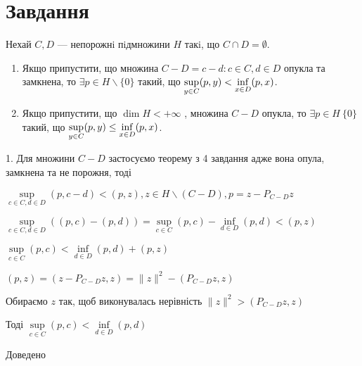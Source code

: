 
\chapter{Завдання \theHchapter}


\begin{tcolorbox}[title=Завдання]
    Нехай $C, D$ — непорожнi пiдмножини $H$ такi, що 
    $C \cap D = \emptyset$. 
    \begin{enumerate}
        \item 
            Якщо припустити, що множина 
            $C - D = {c - d : c \in C, d \in D}$ 
            опукла та замкнена,
            то $ \exists p \in H \backslash \{0\}$ такий, що 
            $ \displaystyle\sup_{y \in C} (p, y) < \displaystyle\inf_{x \in D} (p, x)$.
        \item
            Якщо припустити, що $\dim H < +\infty$ , множина $C - D$
            опукла, то $\exists p \in H\ \{0\}$
            такий, що 
            $\displaystyle\sup_{y \in C} (p, y) \le \displaystyle\inf_{x \in D}(p, x)$.
    \end{enumerate}
    
\end{tcolorbox}





1. Для множини $C - D$ застосуємо теорему з 4 завдання 
адже вона опула, замкнена та не порожня, тоді


$ \sup\limits_{c \in C, d \in D}(p, c - d) < (p, z), 
z \in H \backslash (C-D), p = z - P_{C-D}z $


$\sup\limits_{c \in C, d \in D}((p, c) - (p, d)) = 
\sup\limits_{c \in C}(p, c) - \inf\limits_{d \in D}(p, d) < (p, z)  $


$ \sup\limits_{c \in C}(p, c) < \inf\limits_{d \in D}(p, d) + (p, z)$


$ (p, z) = (z - P_{C-D}z, z) = \|z\|^2 - (P_{C - D}z, z)$


Обираємо $z$ так, щоб виконувалась нерівність
$\|z\|^2 > (P_{C - D}z, z)$


Тоді 
$\sup\limits_{c \in C}(p, c) < \inf\limits_{d \in D}(p, d)$

Доведено



